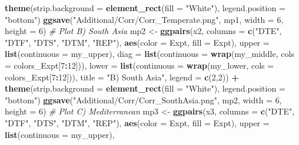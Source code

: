 \documentclass[
]{article}
\newenvironment{Shaded}{\begin{snugshade}}{\end{snugshade}}
\newcommand{\CommentTok}[1]{\textcolor[rgb]{0.56,0.35,0.01}{\textit{#1}}}
\newcommand{\DataTypeTok}[1]{\textcolor[rgb]{0.13,0.29,0.53}{#1}}
\newcommand{\DecValTok}[1]{\textcolor[rgb]{0.00,0.00,0.81}{#1}}
\newcommand{\KeywordTok}[1]{\textcolor[rgb]{0.13,0.29,0.53}{\textbf{#1}}}
\newcommand{\NormalTok}[1]{#1}
\newcommand{\OperatorTok}[1]{\textcolor[rgb]{0.81,0.36,0.00}{\textbf{#1}}}
\newcommand{\StringTok}[1]{\textcolor[rgb]{0.31,0.60,0.02}{#1}}
\begin{document}
\begin{Shaded}
\begin{Highlighting}[]
{{{{{\StringTok{  }\KeywordTok{theme}\NormalTok{(}\DataTypeTok{strip.background =} \KeywordTok{element_rect}\NormalTok{(}\DataTypeTok{fill =} \StringTok{"White"}\NormalTok{),}
        \DataTypeTok{legend.position =} \StringTok{"bottom"}\NormalTok{)}
\KeywordTok{ggsave}\NormalTok{(}\StringTok{"Additional/Corr/Corr_Temperate.png"}\NormalTok{, mp1, }\DataTypeTok{width =} \DecValTok{6}\NormalTok{, }\DataTypeTok{height =} \DecValTok{6}\NormalTok{)}
\CommentTok{# Plot B) South Asia}
\NormalTok{mp2 <-}\StringTok{ }\KeywordTok{ggpairs}\NormalTok{(x2, }\DataTypeTok{columns =} \KeywordTok{c}\NormalTok{(}\StringTok{"DTE"}\NormalTok{, }\StringTok{"DTF"}\NormalTok{, }\StringTok{"DTS"}\NormalTok{, }\StringTok{"DTM"}\NormalTok{, }\StringTok{"REP"}\NormalTok{), }
               \KeywordTok{aes}\NormalTok{(}\DataTypeTok{color =}\NormalTok{ Expt, }\DataTypeTok{fill =}\NormalTok{ Expt),}
        \DataTypeTok{upper  =} \KeywordTok{list}\NormalTok{(}\DataTypeTok{continuous =}\NormalTok{ my_upper),}
        \DataTypeTok{diag   =} \KeywordTok{list}\NormalTok{(}\DataTypeTok{continuous =} \KeywordTok{wrap}\NormalTok{(my_middle, }\DataTypeTok{cols =}\NormalTok{ colors_Expt[}\DecValTok{7}\OperatorTok{:}\DecValTok{12}\NormalTok{])),}
        \DataTypeTok{lower  =} \KeywordTok{list}\NormalTok{(}\DataTypeTok{continuous =} \KeywordTok{wrap}\NormalTok{(my_lower,  }\DataTypeTok{cols =}\NormalTok{ colors_Expt[}\DecValTok{7}\OperatorTok{:}\DecValTok{12}\NormalTok{])),}
        \DataTypeTok{title  =} \StringTok{"B) South Asia"}\NormalTok{, }
        \DataTypeTok{legend =} \KeywordTok{c}\NormalTok{(}\DecValTok{2}\NormalTok{,}\DecValTok{2}\NormalTok{)) }\OperatorTok{+}
\StringTok{  }\KeywordTok{theme}\NormalTok{(}\DataTypeTok{strip.background =} \KeywordTok{element_rect}\NormalTok{(}\DataTypeTok{fill =} \StringTok{"White"}\NormalTok{),}
        \DataTypeTok{legend.position =} \StringTok{"bottom"}\NormalTok{)}
\KeywordTok{ggsave}\NormalTok{(}\StringTok{"Additional/Corr/Corr_SouthAsia.png"}\NormalTok{, mp2, }\DataTypeTok{width =} \DecValTok{6}\NormalTok{, }\DataTypeTok{height =} \DecValTok{6}\NormalTok{)}
\CommentTok{# Plot C) Mediterranean}
\NormalTok{mp3 <-}\StringTok{ }\KeywordTok{ggpairs}\NormalTok{(x3, }\DataTypeTok{columns =} \KeywordTok{c}\NormalTok{(}\StringTok{"DTE"}\NormalTok{, }\StringTok{"DTF"}\NormalTok{, }\StringTok{"DTS"}\NormalTok{, }\StringTok{"DTM"}\NormalTok{, }\StringTok{"REP"}\NormalTok{), }
               \KeywordTok{aes}\NormalTok{(}\DataTypeTok{color =}\NormalTok{ Expt, }\DataTypeTok{fill =}\NormalTok{ Expt),}
        \DataTypeTok{upper  =} \KeywordTok{list}\NormalTok{(}\DataTypeTok{continuous =}\NormalTok{ my_upper),}
}}}}}
\end{Highlighting}
\end{Shaded}
\end{document}
